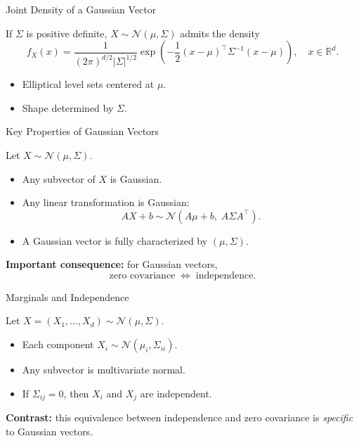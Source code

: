 \documentclass[aspectratio=169]{beamer}
\begin{document}

\begin{frame}{Joint Density of a Gaussian Vector}

If \(\Sigma\) is positive definite, \(X\sim\mathcal{N}(\mu,\Sigma)\) admits the density
\[
f_X(x)
=
\frac{1}{(2\pi)^{d/2}|\Sigma|^{1/2}}
\exp\!\left(
-\frac12 (x-\mu)^\top \Sigma^{-1} (x-\mu)
\right),
\quad x\in\mathbb{R}^d.
\]
\pause
\begin{itemize}
  \item Elliptical level sets centered at \(\mu\).
  \item Shape determined by \(\Sigma\).
\end{itemize}

\end{frame}


\begin{frame}{Key Properties of Gaussian Vectors}

Let \(X\sim\mathcal{N}(\mu,\Sigma)\).
\pause
\begin{itemize}
  \item Any subvector of \(X\) is Gaussian.\pause
  \item Any linear transformation is Gaussian:
  \[
    AX+b \sim \mathcal{N}(A\mu+b,\;A\Sigma A^\top).
  \]\pause
  \item A Gaussian vector is fully characterized by \((\mu,\Sigma)\).\pause
\end{itemize}

\medskip

\textbf{Important consequence:}
for Gaussian vectors,
\[
\text{zero covariance} \;\Longleftrightarrow\; \text{independence}.
\]

\end{frame}


\begin{frame}{Marginals and Independence}

Let \(X=(X_1,\dots,X_d)\sim\mathcal{N}(\mu,\Sigma)\).

\begin{itemize}
  \item Each component \(X_i\sim\mathcal{N}(\mu_i,\Sigma_{ii})\).\pause
  \item Any subvector is multivariate normal.\pause
  \item If \(\Sigma_{ij}=0\), then \(X_i\) and \(X_j\) are independent.\pause
\end{itemize}

\medskip

\textbf{Contrast:}
this equivalence between independence and zero covariance
is \emph{specific} to Gaussian vectors.

\end{frame}
\end{document}
